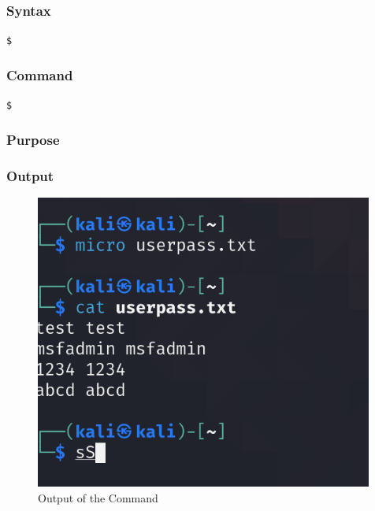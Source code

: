 \documentclass[11pt]{article}
\begin{document}
\subsection{}

\subsubsection*{Syntax}
\begin{verbatim}
$
\end{verbatim}

\subsubsection*{Command}
\begin{verbatim}
$
\end{verbatim}

\subsubsection*{Purpose}

\subsubsection*{Output}
\begin{figure}[H]
    \centering
    \includegraphics[width=0.99\textwidth]{a3_ss (27).png}
    \caption{Output of the Command}
\end{figure}
\subsection{}
\end{document}
